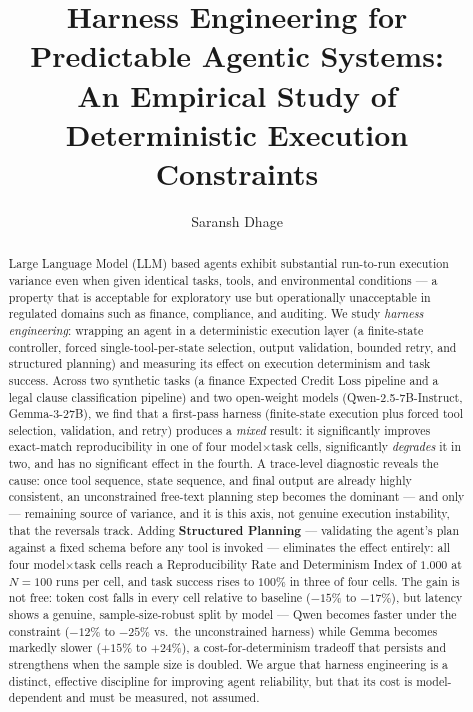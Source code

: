 \documentclass[11pt]{article}
\title{\textbf{Harness Engineering for Predictable Agentic Systems: \\
An Empirical Study of Deterministic Execution Constraints}}
\author[1]{Saransh Dhage}
\affil[1]{Independent Researcher}
\date{}
\begin{document}
\maketitle

\begin{abstract}
Large Language Model (LLM) based agents exhibit substantial run-to-run execution variance even when given identical tasks, tools, and environmental conditions --- a property that is acceptable for exploratory use but operationally unacceptable in regulated domains such as finance, compliance, and auditing. We study \emph{harness engineering}: wrapping an agent in a deterministic execution layer (a finite-state controller, forced single-tool-per-state selection, output validation, bounded retry, and structured planning) and measuring its effect on execution determinism and task success. Across two synthetic tasks (a finance Expected Credit Loss pipeline and a legal clause classification pipeline) and two open-weight models (Qwen-2.5-7B-Instruct, Gemma-3-27B), we find that a first-pass harness (finite-state execution plus forced tool selection, validation, and retry) produces a \emph{mixed} result: it significantly improves exact-match reproducibility in one of four model$\times$task cells, significantly \emph{degrades} it in two, and has no significant effect in the fourth. A trace-level diagnostic reveals the cause: once tool sequence, state sequence, and final output are already highly consistent, an unconstrained free-text planning step becomes the dominant --- and only --- remaining source of variance, and it is this axis, not genuine execution instability, that the reversals track. Adding \textbf{Structured Planning} --- validating the agent's plan against a fixed schema before any tool is invoked --- eliminates the effect entirely: all four model$\times$task cells reach a Reproducibility Rate and Determinism Index of $1.000$ at $N=100$ runs per cell, and task success rises to $100\%$ in three of four cells. The gain is not free: token cost falls in every cell relative to baseline ($-15\%$ to $-17\%$), but latency shows a genuine, sample-size-robust split by model --- Qwen becomes faster under the constraint ($-12\%$ to $-25\%$ vs.\ the unconstrained harness) while Gemma becomes markedly slower ($+15\%$ to $+24\%$), a cost-for-determinism tradeoff that persists and strengthens when the sample size is doubled. We argue that harness engineering is a distinct, effective discipline for improving agent reliability, but that its cost is model-dependent and must be measured, not assumed.
\end{abstract}
\end{document}
